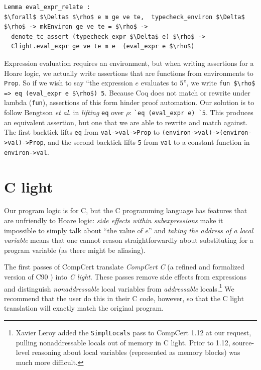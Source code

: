 \documentclass{puthesis}
\begin{document}
\begin{lstlisting}
Lemma eval_expr_relate :
$\forall$ $\Delta$ $\rho$ e m ge ve te,  typecheck_environ $\Delta$ $\rho$ -> mkEnviron ge ve te = $\rho$ ->
  denote_tc_assert (typecheck_expr $\Delta$ e) $\rho$ ->
  Clight.eval_expr ge ve te m e  (eval_expr e $\rho$)
\end{lstlisting}

Expression evaluation requires an environment, but when writing
assertions for a Hoare logic, we actually write assertions that are
functions from environments to \lstinline|Prop|. So if we wish to say
``the expression $e$ evaluates to $5$'', we write 
\lstinline|fun $\rho$ => eq (eval_expr e $\rho$) 5|.  Because Coq does not match or
rewrite under lambda (\lstinline|fun|), assertions of this form hinder
proof automation.  Our solution is to follow Bengtson \emph{et al.}
\cite{bengtson12} in \emph{lifting} \lstinline|eq| over $\rho$:
\lstinline|`eq (eval_expr e) `5|.  This produces an equivalent
assertion, but one that we are able to rewrite and match against. The
first backtick lifts \lstinline|eq| from \lstinline{val->val->Prop} to
\lstinline{(environ->val)->(environ->val)->Prop}, and the second
backtick lifts \lstinline{5} from \lstinline{val} to a constant
function in \lstinline{environ->val}.


\section{C light}
\label{sec:clight}
Our program logic is for C, but the C programming language has features that are
unfriendly to Hoare logic: \emph{side effects within subexpressions} 
make it impossible to simply talk about ``the value of $e$''  and \emph{taking
the address of a local variable} means that one cannot reason straightforwardly about
substituting for a program variable
(as there might be aliasing).

The first passes of CompCert translate
\emph{CompCert C} (a refined and formalized version of C90
\cite{leroy13:compcert}) into \emph{C light}.
These passes remove side effects from expressions
and distinguish \emph{nonaddressable} local variables from
\emph{addressable} locals.\footnote{Xavier Leroy
added the \lstinline|SimplLocals| pass to CompCert 1.12 at our request,
pulling nonaddressable locals out of memory in C light.
Prior to 1.12, source-level reasoning about local
variables (represented as memory blocks) was  much more difficult.} We recommend
that the user do this in their C code, however, so that the C light translation
will exactly match the original program.
\end{document}
